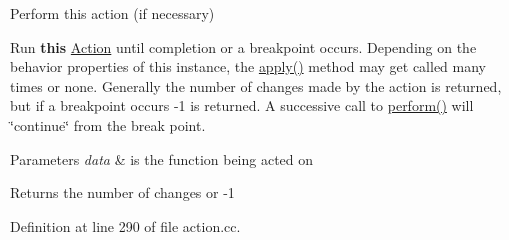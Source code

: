 Perform this action (if necessary) 

Run {\bfseries{this}} \mbox{\hyperlink{class_action}{Action}} until completion or a breakpoint occurs. Depending on the behavior properties of this instance, the \mbox{\hyperlink{class_action_aac1c3999d6c685b15f5d9765a4d04173}{apply()}} method may get called many times or none. Generally the number of changes made by the action is returned, but if a breakpoint occurs -\/1 is returned. A successive call to \mbox{\hyperlink{class_action_a44042367ad3fd93c6dba73a41a047c5c}{perform()}} will \char`\"{}continue\char`\"{} from the break point. 
\begin{DoxyParams}{Parameters}
{\em data} & is the function being acted on \\
\hline
\end{DoxyParams}
\begin{DoxyReturn}{Returns}
the number of changes or -\/1 
\end{DoxyReturn}


Definition at line 290 of file action.\+cc.

